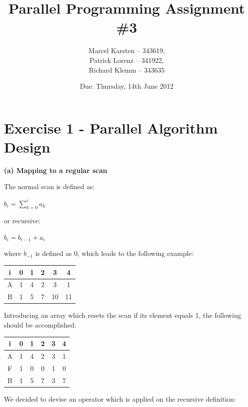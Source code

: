 \documentclass[a4paper,twoside,11pt]{article}
\begin{document}
\pagestyle{fancyplain}

\title{Parallel Programming Assignment \#3} 
\author{Marcel Karsten -- 343619,\\ Patrick Lorenz -- 341922,\\ Richard Klemm -- 343635 }
\date{Due: Thursday, 14th June 2012} %
\maketitle

\lhead{}
\renewcommand{\headrulewidth}{0px}



\section{Exercise 1 - Parallel Algorithm Design}

\textbf{(a) Mapping to a regular scan}

The normal scan is defined as:

$b_i = \sum\limits_{k=0}^{i}a_k$

or recursive:

$b_i = b_{i-1} + a_i$

where $b_{-1}$ is defined as 0, which leads to the following example:

\begin{tabular}{|c|c|c|c|c|c|}
\hline
i&0&1&2&3&4\\
\hline
A&1& 4&2&3&1\\
\hline
B&1&5&7&10&11\\
\hline
\end{tabular}

Introducing an array which resets the scan if its element equals 1, the following should be accomplished:


\begin{tabular}{|c|c|c|c|c|c|}
\hline
i&0&1&2&3&4\\
\hline
A&1& 4&2&3&1\\
\hline
F&1& 0&0&1&0\\
\hline
B&1&5&7&3&7\\
\hline
\end{tabular}

We decided to devise an operator which is applied on the recursive definition:
\end{document}
